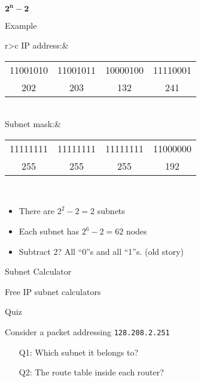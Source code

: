 \begin{frame}{$\mathbf{2^n-2}$}
  \begin{iblock}{Example}
    \begin{tabular}{r>{\ttfamily}c}\toprule
      IP address:&\begin{tabular}{c@{.}c@{.}c@{.}c}
                    11001010&11001011&10000100&11110001\\
                    202&203&132&241
                  \end{tabular}\\\midrule
      Subnet mask:&\begin{tabular}{c@{.}c@{.}c@{.}c}
                     11111111&11111111&11111111&11000000\\
                     255&255&255&192
                   \end{tabular}\\\bottomrule
    \end{tabular}
  \end{iblock}

  \begin{itemize}
  \item There are $2^2-2 = 2$ subnets
  \item Each subnet has $2^6-2 = 62$ nodes
  \item Subtract 2? All ``0''s and all ``1''s. (old story)
  \end{itemize}
\end{frame}

\begin{frame}{Subnet Calculator}
  \begin{iblock}{Free IP subnet calculators}
    \begin{itemize}
    \item[] 
    \item[] 
    \item[] 
    \end{itemize}
  \end{iblock}
\end{frame}

\begin{frame}{Quiz}
  \begin{center}
  \end{center}
  Consider a packet addressing \texttt{128.208.2.251}
  \begin{itemize}
  \item[Q1:] Which subnet it belongs to?
  \item[Q2:] The route table inside each router?
  \end{itemize}
\end{frame}

